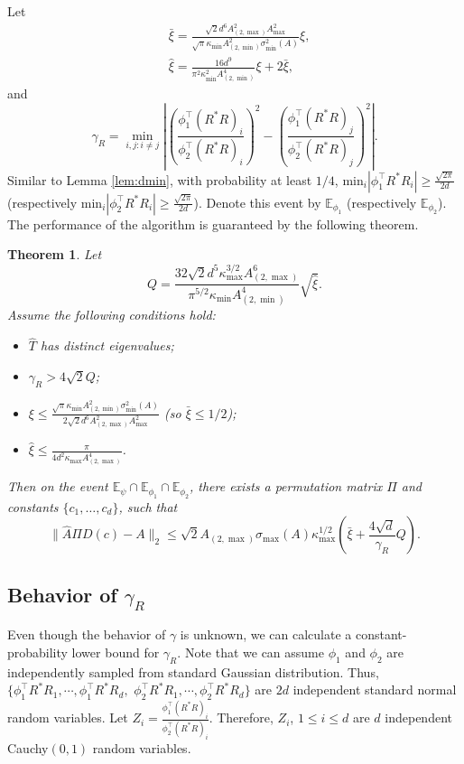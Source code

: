\documentclass[twoside]{article}
\newcommand{\Ephione}{\mathbb{E}_{\phi_1}}
\newcommand{\Ephitwo}{\mathbb{E}_{\phi_2}}
\newcommand{\Epsi}{\mathbb{E}_{\psi}}
\newtheorem{thm}[lemma]{Theorem}
\theoremstyle{definition}
\begin{document}
Let 
\begin{align*}
& \bar{\xi} =   \frac{\sqrt{2}d^6A_{(2,\max)}^2A_{\max}^2}{\sqrt{\pi}\kappa_{\min}A^2_{(2,\min)}\sigma_{\min}^2(A)}\xi, \\
& \widehat{\xi} = \frac{16d^9}{\pi^2\kappa_{\min}^2A^4_{(2,\min)}}\xi + 2\bar{\xi},
\end{align*} 
and 
\begin{equation}
\label{def:gammaR}
\gamma_R =  \min_{i,j: i\neq j} \left\vert \left(\frac{\phi_1^{\top}(R^*R)_i}{\phi_2^{\top}(R^*R)_i}\right)^2 - \left(\frac{\phi_1^{\top}(R^*R)_j}{\phi_2^{\top}(R^*R)_j}\right)^2 \right\vert. 
\end{equation}
Similar to Lemma \ref{lem:dmin}, with probability at least $1/4$, $\text{min}_i |\phi_1^{\top}R^*R_i| \ge \frac{\sqrt{2\pi}}{2d}$ (respectively $\text{min}_i |\phi_2^{\top}R^*R_i| \ge \frac{\sqrt{2\pi}}{2d}$). 
Denote this event by $\Ephione$ (respectively $\Ephitwo$).
The performance of the algorithm is guaranteed by the following theorem.
\begin{thm}
\label{thm:Modefficiency}
Let 
 \[ 
 Q=  \frac{32\sqrt{2}d^5\kappa^{3/2}_{\max}A^6_{(2,\max)}}{\pi^{5/2}\kappa_{\min}A^4_{(2,\min)}} \sqrt{\widehat{\xi}}.
 \] 
 Assume the following conditions hold:
 \begin{itemize}
 \item $\widehat{T}$ has distinct eigenvalues;
 \item $\gamma_R > 4\sqrt{2}Q$;
 \item $\xi \le \frac{\sqrt{\pi}\kappa_{\min}A^2_{(2,\min)}\sigma_{\min}^2(A)}{2\sqrt{2}d^6A_{(2,\max)}^2A_{\max}^2}$ (so $\bar{\xi} \le 1/2$);
 \item $\widehat{\xi} \le \frac{\pi}{4d^2\kappa_{\max}A^4_{(2,\max)}}$.
 \end{itemize}
Then on the event $\Epsi \cap \Ephione \cap \Ephitwo$, there exists a permutation matrix $\Pi$ and constants $\{c_1,\ldots,c_d\}$, such that 
\[
\|\widehat{A}\Pi D(c) - A\|_2 
\le 
\sqrt{2} A_{(2,\max)}\sigma_{\max}(A)\kappa_{\max}^{1/2} \left( \bar{\xi} + \frac{4\sqrt{d}}{\gamma_R}Q\right). 
\]
\end{thm}
\subsection{Behavior of $\gamma_R$}
\label{subsec:gammaR}
Even though the behavior of $\gamma$ is unknown, we can calculate a constant-probability  lower bound for $\gamma_R$. 
Note that we can assume $\phi_1$ and $\phi_2$ are independently sampled from standard Gaussian distribution. 
Thus, $\{\phi_1^{\top}R^*R_1, \cdots, \phi_1^{\top}R^*R_d,$ $\phi_2^{\top}R^*R_1, \cdots, \phi_2^{\top}R^*R_d\}$ are $2d$ independent standard normal random variables. 
Let $Z_i = \frac{\phi_1^{\top}(R^*R)_i}{\phi_2^{\top}(R^*R)_i}$. Therefore, $Z_i$, $1\le i\le d$ are $d$ independent Cauchy$(0,1)$ random variables. 
\end{document}
